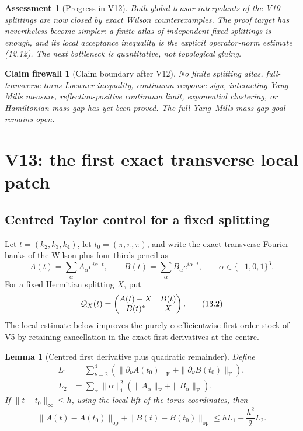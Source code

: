 \documentclass[11pt,oneside]{article}
\newtheorem{lemma}[theorem]{Lemma}
\newtheorem{assessment}[theorem]{Assessment}
\newtheorem{firewall}[theorem]{Claim firewall}
\theoremstyle{definition}
\theoremstyle{remark}
\begin{document}
\begin{assessment}[Progress in V12]
\label{ass:newv12-progress}
Both global tensor interpolants of the V10 splittings are now closed
by exact Wilson counterexamples.  The proof target has nevertheless
become simpler: a finite atlas of independent fixed splittings is
enough, and its local acceptance inequality is the explicit
operator-norm estimate (12.12).  The next bottleneck is quantitative,
not topological gluing.
\end{assessment}

\begin{firewall}[Claim boundary after V12]
\label{fire:newv12-final}
No finite splitting atlas, full-transverse-torus Loewner inequality,
continuum response sign, interacting Yang--Mills measure,
reflection-positive continuum limit, exponential clustering, or
Hamiltonian mass gap has yet been proved.  The full Yang--Mills
mass-gap goal remains open.
\end{firewall}

\section{V13: the first exact transverse local patch}
\label{sec:newv13-local-patch}

\subsection{Centred Taylor control for a fixed splitting}

Let \(t=(k_2,k_3,k_4)\), let
\(t_0=(\pi,\pi,\pi)\), and write the exact transverse Fourier banks
of the Wilson plus four-thirds pencil as
\[
 A(t)=\sum_{\alpha}A_\alpha e^{i\alpha\cdot t},
 \qquad
 B(t)=\sum_{\alpha}B_\alpha e^{i\alpha\cdot t},
 \qquad \alpha\in\{-1,0,1\}^3.                            \tag{13.1}
\]
For a fixed Hermitian splitting \(X\), put
\[
 {\cal Q}_X(t)=
 \begin{pmatrix}A(t)-X&B(t)\\B(t)^*&X\end{pmatrix}.       \tag{13.2}
\]
The local estimate below improves the purely coefficientwise
first-order stock of V5 by retaining cancellation in the exact first
derivatives at the centre.

\begin{lemma}[Centred first derivative plus quadratic remainder]
\label{lem:newv13-taylor}
Define
\[
\begin{aligned}
 L_1&=\sum_{\nu=2}^4
 \left(\|\partial_\nu A(t_0)\|_{\mathrm F}
       +\|\partial_\nu B(t_0)\|_{\mathrm F}\right),\\
 L_2&=\sum_\alpha \|\alpha\|_1^2
 \left(\|A_\alpha\|_{\mathrm F}+\|B_\alpha\|_{\mathrm F}\right).
\end{aligned}                                             \tag{13.3}
\]
If \(\|t-t_0\|_\infty\le h\), using the local lift of the torus
coordinates, then
\[
 \|A(t)-A(t_0)\|_{\mathrm{op}}
 +\|B(t)-B(t_0)\|_{\mathrm{op}}
 \le hL_1+\frac{h^2}{2}L_2.                              \tag{13.4}
\]
\end{lemma}
\end{document}
